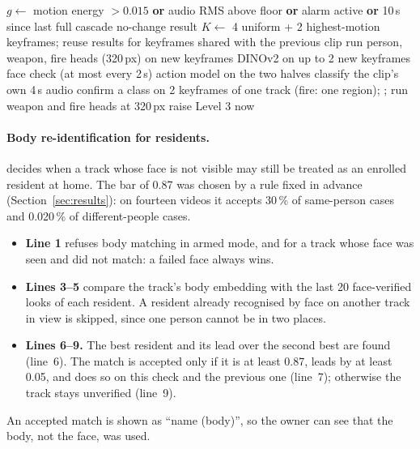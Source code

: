 \begin{algorithm}[!ht]
\caption{Clip engine cascade (every 2\,s) and fast lane (every 4th frame)}
\label{alg:clip}
\small
\begin{algorithmic}[1]
  \State $g \gets$ motion energy $>0.015$ \textbf{or} audio RMS above floor \textbf{or} alarm active \textbf{or} 10\,s since last full cascade
   \Return no-change result \EndIf
  \State $K \gets$ 4 uniform + 2 highest-motion keyframes; reuse results for keyframes shared with the previous clip
  \State run person, weapon, fire heads (320\,px) on new keyframes 
   DINOv2 on up to 2 new keyframes \EndIf {}
   face check (at most every 2\,s) \EndIf {}
   action model on the two halves \EndIf {}
  \State classify the clip's own 4\,s audio 
  \State confirm a class on 2 keyframes of one track (fire: one region); ;  
\EndProcedure
{}
   run weapon and fire heads at 320\,px
     raise Level 3 now \EndIf
  \EndIf
\EndProcedure
\end{algorithmic}
\end{algorithm}

\paragraph{Body re-identification for residents.}  decides when a track whose face is not visible may still be treated as an enrolled resident at home. The bar of 0.87 was chosen by a rule fixed in advance (Section~\ref{sec:results}): on fourteen videos it accepts 30\,\% of same-person cases and 0.020\,\% of different-people cases.
\begin{itemize}
\item \textbf{Line 1} refuses body matching in armed mode, and for a track whose face was seen and did not match: a failed face always wins.
\item \textbf{Lines 3--5} compare the track's body embedding with the last 20 face-verified looks of each resident. A resident already recognised by face on another track in view is skipped, since one person cannot be in two places.
\item \textbf{Lines 6--9.} The best resident and its lead over the second best are found (line~6). The match is accepted only if it is at least 0.87, leads by at least 0.05, and does so on this check and the previous one (line~7); otherwise the track stays unverified (line~9).
\end{itemize}
An accepted match is shown as ``name (body)'', so the owner can see that the body, not the face, was used.

